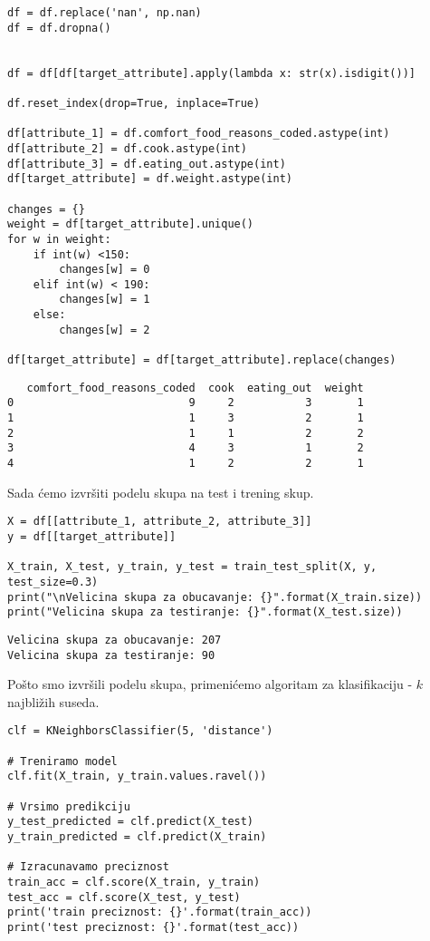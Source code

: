 \documentclass[12pt,a4paper]{article}
\begin{document}
\begin{lstlisting}[mathescape=true]
df = df.replace('nan', np.nan)
df = df.dropna()


df = df[df[target_attribute].apply(lambda x: str(x).isdigit())]

df.reset_index(drop=True, inplace=True)

df[attribute_1] = df.comfort_food_reasons_coded.astype(int)
df[attribute_2] = df.cook.astype(int)
df[attribute_3] = df.eating_out.astype(int)
df[target_attribute] = df.weight.astype(int)

changes = {}
weight = df[target_attribute].unique()
for w in weight:
    if int(w) <150:
        changes[w] = 0
    elif int(w) < 190:
        changes[w] = 1
    else:
        changes[w] = 2

df[target_attribute] = df[target_attribute].replace(changes)
\end{lstlisting}

\begin{verbatim}
   comfort_food_reasons_coded  cook  eating_out  weight
0                           9     2           3       1
1                           1     3           2       1
2                           1     1           2       2
3                           4     3           1       2
4                           1     2           2       1
\end{verbatim}

Sada \' cemo izvr\v siti podelu skupa na test i trening skup.

\begin{lstlisting}
X = df[[attribute_1, attribute_2, attribute_3]]
y = df[[target_attribute]]

X_train, X_test, y_train, y_test = train_test_split(X, y, test_size=0.3)
print("\nVelicina skupa za obucavanje: {}".format(X_train.size))
print("Velicina skupa za testiranje: {}".format(X_test.size))
\end{lstlisting}

\begin{verbatim}
Velicina skupa za obucavanje: 207
Velicina skupa za testiranje: 90
\end{verbatim}

Po\v sto smo izvr\v sili podelu skupa, primeni\' cemo algoritam za klasifikaciju - $k$ najbli\v zih suseda.

\begin{lstlisting}
clf = KNeighborsClassifier(5, 'distance')

# Treniramo model
clf.fit(X_train, y_train.values.ravel())

# Vrsimo predikciju
y_test_predicted = clf.predict(X_test)
y_train_predicted = clf.predict(X_train)

# Izracunavamo preciznost
train_acc = clf.score(X_train, y_train)
test_acc = clf.score(X_test, y_test)
print('train preciznost: {}'.format(train_acc))
print('test preciznost: {}'.format(test_acc))
\end{lstlisting}
\end{document}
